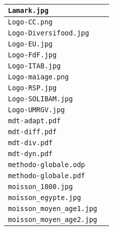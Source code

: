 \begin{center}
\begin{supertabular}{p{.8\textwidth}c}
\texttt{Lamark.jpg} & \cite{Lamark} \\ \hline

\texttt{Logo-CC.png} & \cite{Logo-CC} \\ \hline

\texttt{Logo-Diversifood.jpg} & \cite{Logo-Diversifood} \\ \hline

\texttt{Logo-EU.jpg} & \cite{Logo-EU} \\ \hline

\texttt{Logo-FdF.jpg} & \cite{Logo-FdF} \\ \hline

\texttt{Logo-ITAB.jpg} & \cite{Logo-ITAB} \\ \hline

\texttt{Logo-maiage.png} & \cite{Logo-maiage} \\ \hline

\texttt{Logo-RSP.jpg} & \cite{Logo-RSP} \\ \hline

\texttt{Logo-SOLIBAM.jpg} & \cite{Logo-SOLIBAM} \\ \hline

\texttt{Logo-UMRGV.jpg} & \cite{Logo-UMRGV} \\ \hline

\texttt{mdt-adapt.pdf} & \cite{mdt-adapt} \\ \hline

\texttt{mdt-diff.pdf} & \cite{mdt-diff} \\ \hline

\texttt{mdt-div.pdf} & \cite{mdt-div} \\ \hline

\texttt{mdt-dyn.pdf} & \cite{mdt-dyn} \\ \hline

\texttt{methodo-globale.odp} & \cite{methodo-globale} \\
\texttt{methodo-globale.pdf} & \\ \hline

\texttt{moisson\_1800.jpg} & \cite{moisson_1800} \\ \hline

\texttt{moisson\_egypte.jpg} & \cite{moisson_egypte} \\ \hline

\texttt{moisson\_moyen\_age1.jpg} & \cite{moisson_moyen_age1} \\ \hline

\texttt{moisson\_moyen\_age2.jpg} & \cite{moisson_moyen_age2} \\ \hline


\end{supertabular}
\end{center}
